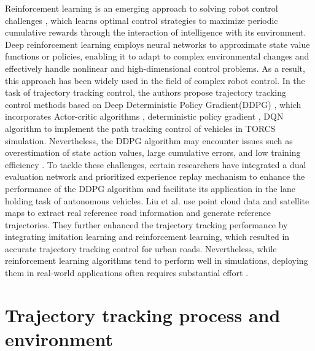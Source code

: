 \documentclass[sn-mathphys]{sn-jnl}%
\theoremstyle{thmstyleone}%
\theoremstyle{thmstyletwo}%
\theoremstyle{thmstylethree}%
\begin{document}
Reinforcement learning is an emerging approach to solving robot control challenges \cite{zhaoPathFollowingOptimization2021a}, which learns optimal control strategies to maximize periodic cumulative rewards through the interaction of intelligence with its environment. Deep reinforcement learning employs neural networks to approximate state value functions or policies, enabling it to adapt to complex environmental changes and effectively handle nonlinear and high-dimensional control problems. As a result, this approach has been widely used in the field of complex robot control\cite{koberReinforcementLearningRobotics2013, dasilvaSurveyTransferLearning2019}. In the task of trajectory tracking control, the authors propose trajectory tracking control methods based on Deep Deterministic Policy Gradient(DDPG) \cite{lillicrapContinuousControlDeep2019}, which incorporates Actor-critic algorithms \cite{kondaActorcriticAlgorithms1999}, deterministic policy gradient \cite{silver2014deterministic}, DQN algorithm \cite{mnihPlayingAtariDeep2013a} to implement the path tracking control of vehicles in TORCS simulation. Nevertheless, the DDPG algorithm may encounter issues such as overestimation of state action values, large cumulative errors, and low training efficiency \cite{fujimoto2018addressing}. To tackle these challenges, certain researchers have integrated a dual evaluation network and prioritized experience replay mechanism to enhance the performance of the DDPG algorithm and facilitate its application in the lane holding task of autonomous vehicles\cite{heLaneFollowingMethod2021}. Liu et al. use point cloud data and satellite maps to extract real reference road information and generate reference trajectories. They further enhanced the trajectory tracking performance by integrating imitation learning and reinforcement learning, which resulted in accurate trajectory tracking control for urban roads\cite{liuReinforcementTrackingEffectiveTrajectory2022}. Nevertheless, while reinforcement learning algorithms tend to perform well in simulations, deploying them in real-world applications often requires substantial effort \cite{guDeepReinforcementLearning2017}.






\section{Trajectory tracking process and environment}\label{sec3}
\end{document}
